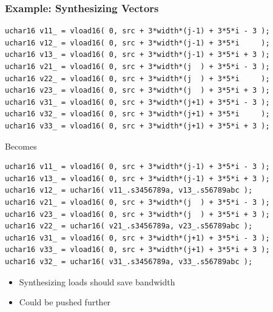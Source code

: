 \documentclass{beamer}
\begin{document}
\begin{frame}[fragile]
  \frametitle{Example: Synthesizing Vectors}
\lstset{style=CL}
\tiny
\begin{lstlisting}
uchar16 v11_ = vload16( 0, src + 3*width*(j-1) + 3*5*i - 3 );
uchar16 v12_ = vload16( 0, src + 3*width*(j-1) + 3*5*i     );
uchar16 v13_ = vload16( 0, src + 3*width*(j-1) + 3*5*i + 3 );
uchar16 v21_ = vload16( 0, src + 3*width*(j  ) + 3*5*i - 3 );
uchar16 v22_ = vload16( 0, src + 3*width*(j  ) + 3*5*i     );
uchar16 v23_ = vload16( 0, src + 3*width*(j  ) + 3*5*i + 3 );
uchar16 v31_ = vload16( 0, src + 3*width*(j+1) + 3*5*i - 3 );
uchar16 v32_ = vload16( 0, src + 3*width*(j+1) + 3*5*i     );
uchar16 v33_ = vload16( 0, src + 3*width*(j+1) + 3*5*i + 3 );
\end{lstlisting}
\normalsize
\centering Becomes
\tiny
\begin{lstlisting}
uchar16 v11_ = vload16( 0, src + 3*width*(j-1) + 3*5*i - 3 );
uchar16 v13_ = vload16( 0, src + 3*width*(j-1) + 3*5*i + 3 );
uchar16 v12_ = uchar16( v11_.s3456789a, v13_.s56789abc );
uchar16 v21_ = vload16( 0, src + 3*width*(j  ) + 3*5*i - 3 );
uchar16 v23_ = vload16( 0, src + 3*width*(j  ) + 3*5*i + 3 );
uchar16 v22_ = uchar16( v21_.s3456789a, v23_.s56789abc );
uchar16 v31_ = vload16( 0, src + 3*width*(j+1) + 3*5*i - 3 );
uchar16 v33_ = vload16( 0, src + 3*width*(j+1) + 3*5*i + 3 );
uchar16 v32_ = uchar16( v31_.s3456789a, v33_.s56789abc );
\end{lstlisting}
\begin{itemize}
\item Synthesizing loads should save bandwidth
\item Could be pushed further
\end{itemize}
\end{frame}
\end{document}

